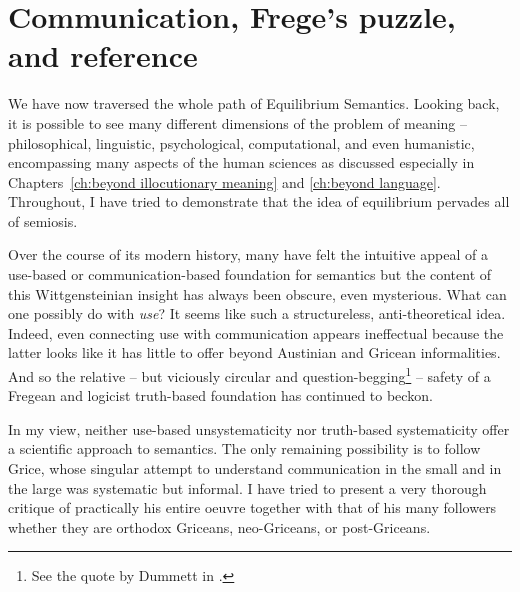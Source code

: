 \chapter{Communication, Frege's puzzle, and reference} \label{ch:centrality of communication}

We have now traversed the whole path of Equilibrium Semantics. Looking back, it is possible to see many different dimensions of the problem of meaning -- philosophical, linguistic, psychological, computational, and even humanistic, encompassing many aspects of the human sciences as discussed especially in Chapters~\ref{ch:beyond illocutionary meaning} and \ref{ch:beyond language}. Throughout, I have tried to demonstrate that the idea of equilibrium pervades all of semiosis.


Over the course of its modern history, many have felt the intuitive appeal of a use-based or communication-based foundation for semantics but the content of this Wittgensteinian insight has always been obscure, even mysterious. What can one possibly do with \emph{use}? It seems like such a structureless, anti-theoretical idea. Indeed, even connecting use with communication appears ineffectual because the latter looks like it has little to offer beyond Austinian and Gricean informalities. And so the relative -- but viciously circular and question-begging\footnote{See the quote by Dummett in .} -- safety of a Fregean and logicist truth-based foundation has continued to beckon.

In my view, neither use-based unsystematicity nor truth-based systematicity offer a scientific approach to semantics. The only remaining possibility is to follow Grice, whose singular attempt to understand communication in the small and in the large was systematic but informal. I have tried to present a very thorough critique of practically his entire oeuvre together with that of his many followers whether they are orthodox Griceans, neo-Griceans, or post-Griceans.

